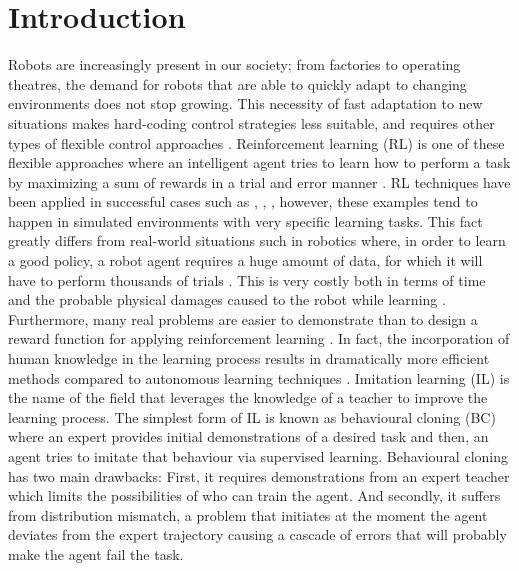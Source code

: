 \section{Introduction}

Robots are increasingly present in our society; from factories to operating theatres, the demand for robots that are able to quickly adapt to changing environments does not stop growing. This necessity of fast adaptation to new situations makes hard-coding control strategies less suitable, and requires other types of flexible control approaches \cite{need-of-flexible-control-approaches}. Reinforcement learning (RL) is one of these flexible approaches where an intelligent agent tries to learn how to perform a task by maximizing a sum of rewards in a trial and error manner \cite{Sutton:1998}. RL techniques have been applied in successful cases such as \cite{Atari-RL}, \cite{alphaGO-silver-2016}, \cite{openAI-hand}, however, these examples tend to happen in simulated environments with very specific learning tasks. This fact greatly differs from real-world situations such in robotics where, in order to learn a good policy, a robot agent requires a huge amount of data, for which it will have to perform thousands of trials  \cite{reinforcement-learning-costly-Kober:2013}. This is very costly both in terms of time and the probable physical damages caused to the robot while learning \cite{TAMER-Knox-Stone:2009}. Furthermore, many real problems are easier to demonstrate than to design a reward function for applying reinforcement learning \cite{kostrikov2019imitation}. In fact, the incorporation of human knowledge in the learning process results in dramatically more efficient methods compared to autonomous learning techniques \cite{Global-overview-Attia:2018}. Imitation learning (IL) is the name of the field that leverages the knowledge of a teacher to improve the learning process. The simplest form of IL is known as behavioural cloning (BC) where an expert provides initial demonstrations of a desired task and then, an agent tries to imitate that behaviour via supervised learning.  Behavioural cloning has two main drawbacks: First, it requires demonstrations from an expert teacher which limits the possibilities of who can train the agent. And secondly, it suffers from distribution mismatch, a problem that initiates at the moment the agent deviates from the expert trajectory causing a cascade of errors that will probably make the agent fail the task.

\setlength{\parskip}{1em}

